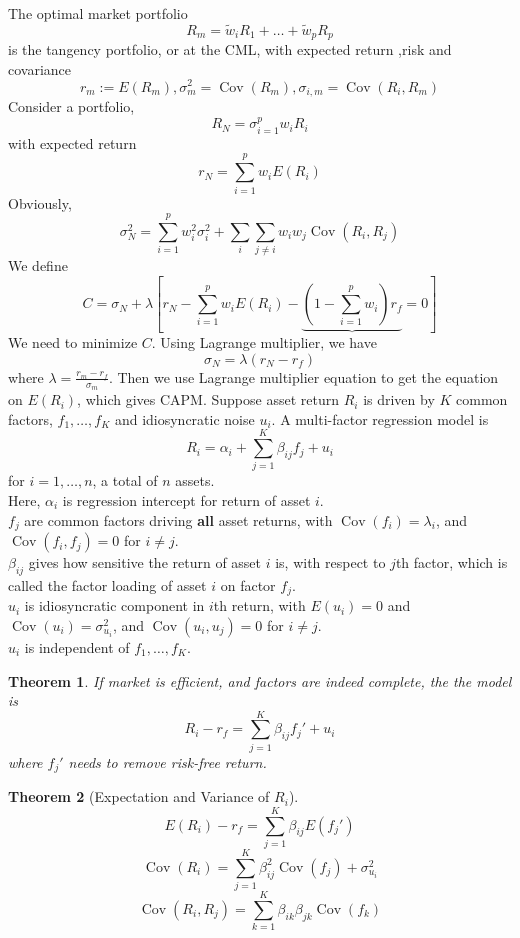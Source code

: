 \documentclass[11pt]{article}
\newtheorem{theorem}{Theorem}[section]
\theoremstyle{definition}
\DeclareMathOperator{\cov}{Cov}
\begin{document}
The optimal market portfolio
\[
R_m = \tilde{w}_iR_1 + \ldots + \tilde{w}_pR_p
\]
is the tangency portfolio, or at the CML, with expected return ,risk and covariance
\[
r_m:=E(R_m), \sigma_m^2 = \cov(R_m), \sigma_{i, m}= \cov(R_i, R_m)
\]
Consider a portfolio,
\[
R_N = \sigma_{i=1}^p w_iR_i
\]
with expected return
\[
r_N = \sum_{i=1}^p w_iE(R_i)
\]
Obviously,
\[
\sigma_N^2 = \sum_{i=1}^p w_i^2 \sigma_i^2 + \sum_{i}\sum_{j\neq i} w_i w_j \cov(R_i, R_j)
\]
We define
\[
C = \sigma_N + \lambda[r_N - \sum_{i=1}^p w_iE(R_i)-\underbrace{(1-\sum_{i=1}^p w_i)r_f}{=0}]
\]
We need to minimize $C$. Using Lagrange multiplier, we have
\[
\sigma_N = \lambda(r_N - r_f)
\]
where $\lambda = \frac{r_m-r_f}{\sigma_m}$. Then we use Lagrange multiplier equation to get the equation on $E(R_i)$, which gives CAPM.
Suppose asset return $R_i$ is driven by $K$ common factors, $f_1, \ldots, f_K$ and idiosyncratic noise $u_i$. A multi-factor regression model is
\[
R_i = \alpha_i + \sum_{j=1}^K \beta_{ij}f_j + u_i
\]
for $i = 1, \ldots, n$, a total of $n$ assets.\\
Here, $\alpha_i$ is regression intercept for return of asset $i$.\\
$f_j$ are common factors driving \textbf{all} asset returns, with $\cov(f_i)=\lambda_i$, and $\cov(f_i, f_j)=0$ for $i\neq j$.\\
$\beta_{ij}$ gives how sensitive the return of asset $i$ is, with respect to $j$th factor, which is called the factor loading of asset $i$ on factor $f_j$.\\
$u_i$ is idiosyncratic component in $i$th return, with $E(u_i)=0$ and $\cov(u_i)=\sigma_{u_i}^2$, and $\cov(u_i,u_j)=0$ for $i\neq j$.\\
$u_i$ is independent of $f_1, \ldots, f_K$.\\
\begin{theorem}\normalfont If market is efficient, and factors are indeed complete, the the model is
\[
R_i-r_f = \sum_{j=1}^K \beta_{ij}f_{j}' + u_i
\]
where $f_j'$ needs to remove risk-free return.\end{theorem}
\begin{theorem}[Expectation and Variance of {$R_i$}]
\normalfont 
\[
E(R_i)-r_f = \sum_{j=1}^K \beta_{ij}E(f_j')
\]
\[
\cov(R_i) = \sum_{j=1}^K \beta_{ij}^2\cov(f_j) + \sigma_{u_i}^2
\]
\[
\cov(R_i, R_j) = \sum_{k=1}^K \beta_{ik}\beta_{jk}\cov(f_k)
\]
\end{theorem}
\end{document}

